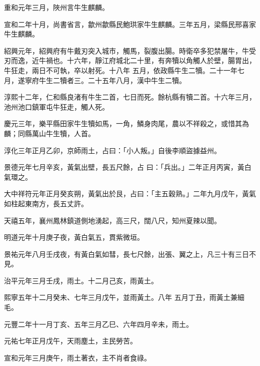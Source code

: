\begin{pinyinscope}
 重和元年三月，陜州言牛生麒麟。



 宣和二年十月，尚書省言，歙州歙縣民鮑珙家牛生麒麟。三年五月，梁縣民邢喜家牛生麒麟。



 紹興元年，紹興府有牛戴刃突入城市，觸馬，裂腹出腸。時衛卒多犯禁屠牛，牛受刃而逸，近牛禍也。十六年，靜江府城北二十里，有奔犢以角觸人於壁，腸胃出，牛狂走，兩日不可執，卒以射死。十八年
 五月，依政縣牛生二犢。二十一年七月，遂寧府牛生二犢者三。二十五年八月，漢中牛生二犢。



 淳熙十二年，仁和縣良渚有牛生二首，七日而死。餘杭縣有犢二首。十六年三月，池州池口鎮軍屯牛狂走，觸人死。



 慶元三年，樂平縣田家牛生犢如馬，一角，鱗身肉尾，農以不祥殺之，或惜其為麟；同縣萬山牛生犢，人首。



 淳化三年正月乙卯，京師雨土，占曰：「小人叛。」自後李順盜據益州。



 景德元年七月辛亥，黃氣出壁，長五尺餘，占
 曰：「兵出。」二年正月丙寅，黃白氣環之。



 大中祥符元年正月癸亥朔，黃氣出於艮，占曰：「主五穀熟。」二年九月戊午，黃氣如柱起東南方，長五丈許。



 天禧五年，襄州鳳林鎮道側地湧起，高三尺，闊八尺，知州夏辣以聞。



 明道元年十月庚子夜，黃白氣五，貫紫微垣。



 景祐元年八月壬戌夜，有黃白氣如彗，長七尺餘，出張、翼之上，凡三十有三日不見。



 治平元年三月壬戌，雨土。十二月己亥，雨黃土。



 熙寧五年十二月癸未、七年三月戊午，並雨黃土。八年
 五月丁丑，雨黃土兼細毛。



 元豐二年十一月丁亥、五年三月乙巳、六年四月辛未，雨土。



 元祐七年正月戊午，天雨塵土，主民勞苦。



 宣和元年三月庚午，雨土著衣，主不肖者食祿。




\end{pinyinscope}
